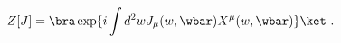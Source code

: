 \begin{equation}
  Z[J] = \bra \exp \{ i\int d^2w J_\mu (w,\wbar ) X^{\mu}(w,\wbar )
  \} \ket \ .
\label{genfun}
\end{equation}

